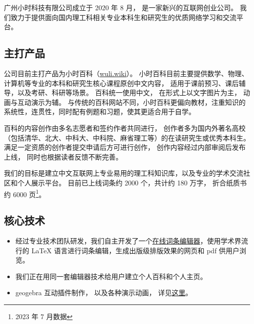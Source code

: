 
广州小时科技有限公司成立于 2020 年 8 月， 是一家新兴的互联网创业公司。 我们致力于提供面向国内理工科相关专业本科生和研究生的优质网络学习和交流平台。


\subsection{主打产品}
公司目前主打产品为小时百科（\href{https://wuli.wiki}{wuli.wiki}）。 小时百科目前主要提供数学、物理、计算机等专业的本科和研究生核心课程原创中文内容， 适用于课前预习、课后辅导，以及考研、科研等场景。 百科统一使用中文， 在形式上以文字图片为主， 动画与互动演示为辅。 与传统的百科网站不同，小时百科更偏向教材，注重知识的系统性，连贯性，同时配有例题和习题，使其更适合用于自学。

百科的内容创作由多名志愿者和签约作者共同进行， 创作者多为国内外著名高校（包括清华、北大、中科大、中科院、麻省理工等）的在读研究生或优秀本科生。 满足一定资质的创作者提交申请后方可进行创作， 创作内容经过内部审阅后发布上线， 同时也根据读者反馈不断完善。

我们的目标是建立中文互联网上专业易用的理工科知识库，以及专业的学术交流社区和个人展示平台。 目前已上线词条约 2000 个，共计约 180 万字， 折合纸质书约 6000 页\footnote{2023 年 7 月数据}。

\subsection{核心技术}
\begin{itemize}
\item 经过专业技术团队研发，我们自主开发了一个\href{https://wuli.wiki/editor/}{在线词条编辑器}，使用学术界流行的 LaTeX 语言进行词条编辑，生成出版级排版效果的网页和 pdf 供用户浏览。
\item 我们正在用同一套编辑器技术给用户建立个人百科和个人主页。
\item geogebra 互动插件制作， 以及各种演示动画， 详见\href{http://wuli.wiki/apps}{这里}。
\end{itemize}
